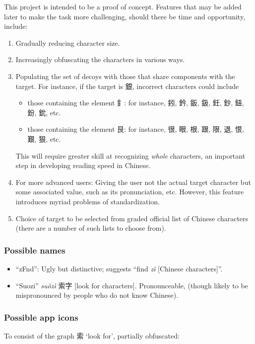 \documentclass[11pt,asymmetric]{article}
\newcommand\gr[2]{\scalebox{#2}{\texttt{[image: \#1]}}}
\begin{document}
This project is intended to be a proof of concept. Features that may be added later to make the task more challenging, should there be time and opportunity, include:\begin{enumerate}
	\item Gradually reducing character size.
	\item Increasingly obfuscating the characters in various ways.
	\item Populating the set of decoys with those that share components with the target. For instance, if the target is 銀, incorrect characters could include
		\begin{itemize}
		\item those containing the element 釒: for instance, 鈏, 鈐, 鈑, 鈒, 鈓, 鈔, 鈕, 鈖, 鈗, etc.
		\item those containing the element 艮: for instance, 很, 眼, 根, 跟, 限, 退, 恨, 艱, 狠, etc.
		\end{itemize}
	This will require greater skill at recognizing \textit{whole} characters, an important step in developing reading speed in Chinese.
	\item For more advanced users: Giving the user not the actual target character but some associated value, such as its pronunciation, etc. However, this feature introduces myriad problems of standardization. 
	\item Choice of target to be selected from graded official list of Chinese characters (there are a number of such lists to choose from).
	\end{enumerate}

\subsubsection{Possible names}
\begin{itemize}
	\item ``zFnd'': Ugly but distinctive; suggests ``find \textit{zì} [Chinese characters]''.
	\item ``Suozi'' \textit{suǒzì} 索字 [look for characters]. Pronounceable, (though likely to be mispronounced by people who do not know Chinese).
	\end{itemize}

\subsubsection{Possible app icons}
To consist of the graph 索 `look for', partially obfuscated:
  \begin{center}
  	\gr{索02_512sq_sprayed.png}{.1}\quad
  	\gr{索02_512sq_colored_stainedglassX10_stainedglassX50_mosaic_colorchange_glowingedges_chalk_ink_contrast_accentededges_color.png}{.1}\quad
	\gr{索02_512sq_colored_stainedglass.png}{.1}\quad
	\gr{索02_512sq_colored_stainedglass_angledstrokes.png}{.1}
  \end{center}
\end{document}
